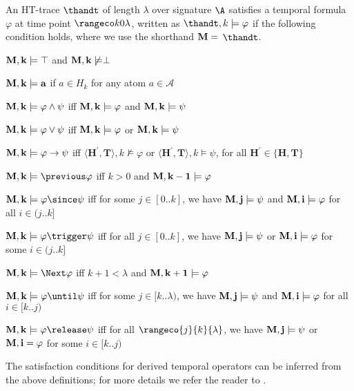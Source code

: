 \begin{definition}
  An HT-trace $\thandt$ of length $\lambda$ over signature $\A$
  satisfies a temporal formula $\varphi$ at time point
  $\kinlambda$, written as $\thandt,k \models \varphi$ if
  the following condition holds, where we use the shorthand
  $\bf{M} =$ $\thandt$.
\begin{description}
  \item $\bf{M},k \models \top$ and $\bf{M}, k \not \models \perp$
  \item $\bf{M},k \models a$ if $a \in H_{k}$ for any atom $a \in \mathcal{A}$
  \item $\bf{M},k \models \varphi \wedge \psi$ iff $\bf{M}, k \models \varphi$ and $\bf{M}, k \models \psi$
  \item $\bf{M},k \models \varphi \vee \psi$ iff $\bf{M}, k \models \varphi$ or $\bf{M}, k \models \psi$
  \item $\bf{M},k \models \varphi \rightarrow \psi$ iff 
    $\langle \bm{H}^{\prime},\bm{T} \rangle, k \not \models \varphi$ 
    or $\langle \bm{H}^{\prime},\bm{T} \rangle, k \models \psi$, 
    for all $\bm{H}^{\prime} \in\{\bm{H}, \bm{T}\}$
  \item $\bf{M},k \models \previous \varphi$ iff $k>0$ and $\bf{M},k-1 \models \varphi$
  \item $\bf{M},k \models \varphi \since \psi$ iff for some $j \in[0 . . k]$, we have $\bf{M}, j \models \psi$ and $\bf{M},i \models \varphi$ for all $i \in(j . . k]$
  \item $\bf{M},k \models \varphi \trigger \psi$ iff for all $j \in[0 . . k]$, we have $\bf{M}, j \models \psi$ or $\bf{M}, i \models \varphi$ for some $i \in(j . . k]$
  \item $\bf{M},k \models \Next \varphi$ iff $k+1<\lambda$ and $\bf{M}, k+1 \models \varphi$
  \item $\bf{M}, k \models \varphi \until \psi$ iff for some $j \in[k . . \lambda)$, we have $\bf{M}, j \models \psi$ and $\bf{M}, i \models \varphi$ for all $i \in[k . . j)$
  \item $\bf{M}, k \models \varphi \release \psi$ iff for all $\rangeco{j}{k}{\lambda}$, we have $\bf{M}, j \models \psi$ or $\bf{M},
    i=\varphi$ for some $i \in[k . . j)$
\end{description}
\end{definition}

The satisfaction conditions for derived temporal operators can be
inferred from the above definitions; for more details we refer the
reader to \cite{agcadipescscvi20a}.

